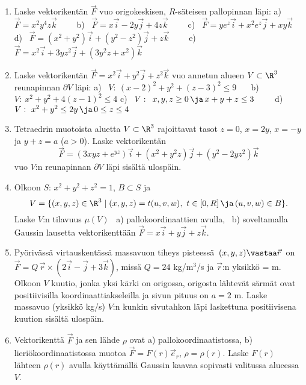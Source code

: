 \pagebreak
\Harj
\begin{enumerate}

\item
Laske vektorikentän $\vec F$ vuo origokeskisen, $R$-säteisen pallopinnan
läpi: \vspace{1mm}\newline
a) \ $\vec F=x^2y^4z\vec k \qquad $
b) \ $\vec F=x\vec i-2y\vec j+4z\vec k \qquad$
c) \ $\vec F=ye^z\vec i+x^2e^z\vec j+xy\vec k$ \newline
d) \ $\vec F=(x^2+y^2)\vec i+(y^2-z^2)\vec j+z\vec k \qquad$
e) \ $\vec F=x^2\vec i+3yz^2\vec j+(3y^2z+x^2)\vec k$

\item
Laske vektorikentän $\vec F=x^2\vec i+y^2\vec j+z^2\vec k$ vuo annetun alueen $V\subset\R^3$
reunapinnan $\partial V$ läpi: \vspace{1mm}\newline
a) \ $V:\ (x-2)^2+y^2+(z-3)^2 \le 9 \quad\,\ $
b) \ $V:\ x^2+y^2+4(z-1)^2 \le 4$ \newline
c) \ $V:\,\ x,y,z \ge 0\,\ja\,x+y+z \le 3 \qquad$
d) \ $V:\ x^2+y^2 \le 2y\,\ja\,0 \le z \le 4$

\item
Tetraedrin muotoista aluetta $V\subset\R^3$ rajoittavat tasot $z=0$, $x=2y$, $x=-y$ ja
$y+z=a$ ($a>0$). Laske vektorikentän
\[
\vec F=(3xyz+e^{yz})\vec i+(x^2+y^2z)\vec j+(y^2-2yz^2)\vec k
\]
vuo $V$:n reunapinnan $\partial V$ läpi sisältä ulospäin.

\item
Olkoon $S:\,x^2+y^2+z^2=1$, $B \subset S$ ja
\[
V= \{(x,y,z)\in\R^3 \mid (x,y,z)=t(u,v,w),\ t\in[0,R]\,\ja\,(u,v,w) \in B\}.
\]
Laske $V$:n tilavuus $\mu(V)$ \ a) pallokoordinaattien avulla, \ b) soveltamalla Gaussin 
lausetta vektorikenttään $\vec F=x\vec i+y\vec j+z\vec k$.

\item
Pyörivässä virtauskentässä massavuon tiheys pisteessä $\,(x,y,z) \vastaa \vec r\,$ on 
$\vec F=Q\,\vec r\times(2\vec i-\vec j+3\vec k)$, missä $Q=24$ kg/m$^3$/s ja $\vec r$:n
yksikkö = m. Olkoon $V$ kuutio, jonka yksi kärki on origossa, origosta lähtevät särmät ovat 
positiivisilla koordinaattiakseleilla ja sivun pituus on $a=2$ m. Laske massavuo (yksikkö kg/s)
$V$:n kunkin sivutahkon läpi laskettuna positiivisena kuution sisältä ulospäin.

\item 
Vektorikenttä $\vec F$ ja sen lähde $\rho$ ovat a) pallokoordinaatistossa, 
b) lieriökoordinaatistossa muotoa $\vec F= F(r)\vec e_r$, $\rho = \rho(r)$. Laske $F(r)$ 
lähteen $\rho(r)$ avulla käyttämällä Gaussin kaavaa sopivasti valitussa alueessa $V$.


\end{enumerate}
